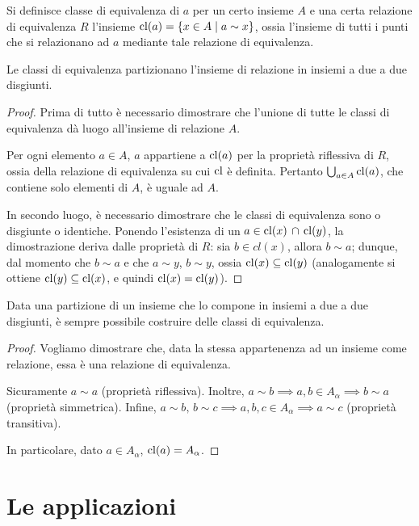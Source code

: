 Si definisce classe di equivalenza di $a$ per un certo insieme
$A$ e una certa relazione di equivalenza $R$ l'insieme
$\operatorname{cl}(a)=\{x \in A \mid a \sim x\}$, ossia l'insieme di tutti i punti che
si relazionano ad $a$ mediante tale relazione di equivalenza.

\begin{theorem}
    Le classi di equivalenza partizionano l'insieme di relazione
    in insiemi a due a due disgiunti.
\end{theorem}

\begin{proof}
    Prima di tutto è necessario dimostrare che l'unione di tutte
    le classi di equivalenza dà luogo all'insieme di relazione $A$.

    Per ogni elemento $a \in A$, $a$ appartiene a $\operatorname{cl}(a)$ per la proprietà
    riflessiva di $R$, ossia della relazione di equivalenza su cui
    $\operatorname{cl}$ è definita. Pertanto $\bigcup_{a \in A} \operatorname{cl}(a)$, che contiene solo
    elementi di $A$, è uguale ad $A$.

    In secondo luogo, è necessario dimostrare che le classi di equivalenza
    sono o disgiunte o identiche. Ponendo l'esistenza
    di un $a \in \operatorname{cl}(x) \, \cap \, \operatorname{cl}(y)$, la dimostrazione deriva dalle proprietà
    di $R$: sia $b \in cl(x)$, allora $b \sim a$; dunque, dal momento che $b \sim a$ e che
    $a \sim y$, $b \sim y$, ossia $\operatorname{cl}(x) \subseteq \operatorname{cl}(y)$ (analogamente si ottiene
    $\operatorname{cl}(y) \subseteq \operatorname{cl}(x)$, e quindi $\operatorname{cl}(x) = \operatorname{cl}(y)$).
\end{proof}

\begin{theorem}
    Data una partizione di un insieme che lo compone in insiemi a due
    a due disgiunti, è sempre possibile costruire delle classi di equivalenza.
\end{theorem}

\begin{proof}
    Vogliamo dimostrare che, data la stessa appartenenza ad un insieme come relazione,
    essa è una relazione di equivalenza.

    Sicuramente $a \sim a$ (proprietà riflessiva).
    Inoltre, $a \sim b \implies a, b \in A_\alpha \implies b \sim a$
    (proprietà simmetrica).
    Infine, $a \sim b, \, b \sim c \implies a, b, c \in A_\alpha \implies a \sim c$
    (proprietà transitiva).

    In particolare, dato $a \in A_\alpha$, $\operatorname{cl}(a) = A_\alpha$.
\end{proof}

\section{Le applicazioni}

